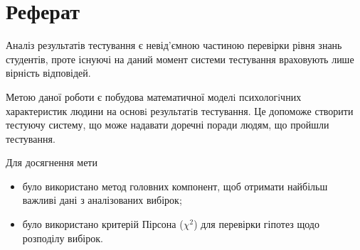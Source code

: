 \chapter*{Реферат}
\thispagestyle{empty}

Аналіз результатів тестування є невід’ємною частиною перевірки рівня знань
студентів, проте існуючі на даний момент системи тестування враховують
лише вірність відповідей.

Метою даної роботи є побудова математичної моделi психологiчних характеристик
людини на основi результатiв тестування.
Це допоможе створити тестуючу систему, що може надавати доречні поради людям,
що пройшли тестування.

Для досягнення мети
\begin{itemize}
  \item 
    було використано метод головних компонент,
    щоб отримати найбільш важливі дані з аналізованих вибірок;
  \item
    було використано критерій Пірсона ($\chi^2$) для перевірки гіпотез щодо
    розподілу вибірок.
\end{itemize}

